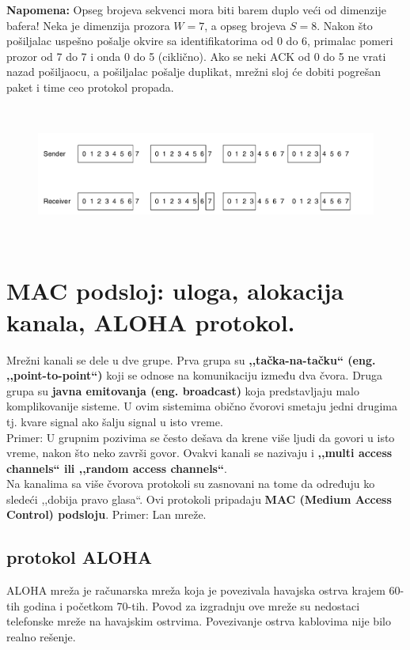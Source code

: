 \documentclass[a4paper]{article}
\begin{document}
        \textbf{Napomena:} Opseg brojeva sekvenci mora biti barem duplo veći od dimenzije bafera!
        Neka je dimenzija prozora $W=7$, a opseg brojeva $S=8$. Nakon što pošiljalac uspešno
        pošalje okvire sa identifikatorima od 0 do 6, primalac pomeri prozor od 7 do 7 i 
        onda 0 do 5 (ciklično). Ako se neki ACK od 0 do 5 ne vrati nazad pošiljaocu, a
        pošiljalac pošalje duplikat, mrežni sloj će dobiti pogrešan paket i time ceo
        protokol propada.

        \begin{figure}[H]
            \begin{center}
                \includegraphics[width=120mm,height=45mm]{Slike/selektivno_ponavljanje.png}
            \end{center}
        \end{figure} 
    
\section{MAC podsloj: uloga, alokacija kanala, ALOHA protokol.}
    Mrežni kanali se dele u dve grupe. Prva grupa su \textbf{,,tačka-na-tačku`` (eng. ,,point-to-point``)}
    koji se odnose na komunikaciju između dva čvora. Druga grupa su \textbf{javna emitovanja (eng. broadcast)}
    koja predstavljaju malo komplikovanije sisteme. U ovim sistemima obično čvorovi smetaju jedni
    drugima tj. kvare signal ako šalju signal u isto vreme. \\
    \indent Primer: U grupnim pozivima se često
    dešava da krene više ljudi da govori u isto vreme, nakon što neko završi govor. 
    Ovakvi kanali se nazivaju i \textbf{,,multi access channels`` ili ,,random access channels``}. \\
    \indent Na kanalima sa više čvorova protokoli su zasnovani na tome da određuju ko sledeći
    ,,dobija pravo glasa``. Ovi protokoli pripadaju \textbf{MAC (Medium Access Control) podsloju}.
    Primer: Lan mreže. 
        
    \subsection{protokol ALOHA}
        ALOHA mreža je računarska mreža koja je povezivala havajska ostrva krajem 60-tih godina
        i početkom 70-tih. Povod za izgradnju ove mreže su nedostaci telefonske mreže na havajskim
        ostrvima. Povezivanje ostrva kablovima nije bilo realno rešenje. \\
        
\end{document}

